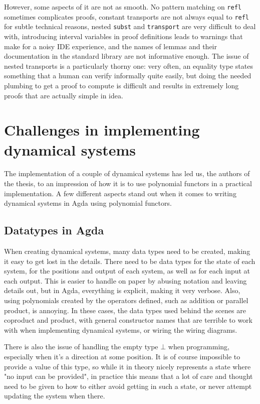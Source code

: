 However, some aspects of it are not as smooth. No pattern matching on \texttt{refl} sometimes complicates proofs, constant transports are not always equal to \texttt{refl} for subtle technical reasons, nested \texttt{subst} and \texttt{transport} are very difficult to deal with, introducing interval variables in proof definitions leads to warnings that make for a noisy IDE experience, and the names of lemmas and their documentation in the standard library are not informative enough. The issue of nested transports is a particularly thorny one: very often, an equality type states something that a human can verify informally quite easily, but doing the needed plumbing to get a proof to compute is difficult and results in extremely long proofs that are actually simple in idea.

\section{Challenges in implementing dynamical systems}
The implementation of a couple of dynamical systems has led us, the authors of the thesis, to an impression of how it is to use polynomial functors in a practical implementation. A few different aspects stand out when it comes to writing dynamical systems in Agda using polynomial functors.

\subsection{Datatypes in Agda}

When creating dynamical systems, many data types need to be created, making it easy to get lost in the details. There need to be data types for the state of each system, for the positions and output of each system, as well as for each input at each output. This is easier to handle on paper by abusing notation and leaving details out, but in Agda, everything is explicit, making it very verbose. Also, using polynomials created by the operators defined, such as addition or parallel product, is annoying. In these cases, the data types used behind the scenes are coproduct and product, with general constructor names that are terrible to work with when implementing dynamical systems, or wiring the wiring diagrams.

There is also the issue of handling the empty type $\bot$ when programming, especially when it's a direction at some position. It is of course impossible to provide a value of this type, so while it in theory nicely represents a state where "no input can be provided", in practice this means that a lot of care and thought need to be given to how to either avoid getting in such a state, or never attempt updating the system when there.


